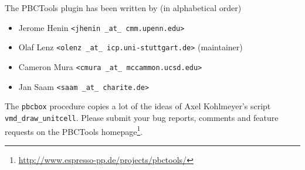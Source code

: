 \documentclass[a4paper, DIV12]{scrartcl}
\newcommand{\pbctools}{PBCTools\xspace}
\begin{document}
The \pbctools plugin has been written by (in alphabetical order)
\begin{itemize}
\item Jerome Henin \texttt{<jhenin \_at\_ cmm.upenn.edu>}
\item Olaf Lenz \texttt{<olenz \_at\_ icp.uni-stuttgart.de>} (maintainer)
\item Cameron Mura \texttt{<cmura \_at\_ mccammon.ucsd.edu>}
\item Jan Saam \texttt{<saam \_at\_ charite.de>}
\end{itemize}
The \texttt{pbcbox} procedure copies a lot of the ideas of Axel
Kohlmeyer's script \texttt{vmd\_draw\_unitcell}.
Please submit your bug reports, comments and feature requests on the
\pbctools
homepage\footnote{\url{http://www.espresso-pp.de/projects/pbctools/}}.
\end{document}
